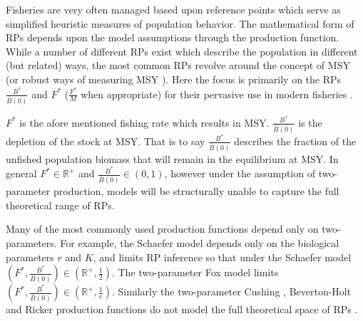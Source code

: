 \documentclass[11pt]{ucscthesis}
\begin{document}
{%
Fisheries are very often managed based upon reference points %
which serve as simplified heuristic measures of population behavior. The
mathematical form of RPs depends upon the model assumptions through the
production function. %
While a number of different RPs exist which describe the population in different
(but related) ways, the most common RPs revolve around the concept of MSY (or robust
ways of measuring MSY \cite{hilborn_pretty_2010,punt_management_2016}).
Here the focus is primarily on the RPs $\frac{B^*}{\bar B(0)}$ and $F^*$ ($\frac{F^*}{M}$ when appropriate)
for their pervasive use in modern fisheries \cite{punt_extending_2019}. %

%
$F^*$ is the afore mentioned fishing rate which results in MSY. $\frac{B^*}{\bar B(0)}$
is the depletion of the stock at MSY. That is to say $\frac{B^*}{\bar B(0)}$ describes
the fraction of the unfished population biomass that will remain in the equilibrium
at MSY. In general $F^*\in\mathbb{R}^+$ and \mbox{$\frac{B^*}{\bar B(0)}\in\left(0, 1\right)$,}
however under the assumption of two-parameter production, %
models will be structurally unable to capture the full theoretical range of RPs.

%
Many of the most commonly used production functions depend only
on two-parameters. For example, the Schaefer model %
depends only on the biological parameters $r$ and $K$, and limits RP inference
so that under the Schaefer model $\left(F^*, \frac{B^*}{\bar B(0)}\right)\in \left(\mathbb{R}^+, \frac{1}{2}\right)$.
The two-parameter Fox model \cite{fox_jr_exponential_1970} limits $\left(F^*, \frac{B^*}{\bar B(0)}\right)\in \left(\mathbb{R}^+, \frac{1}{e}\right)$.
Similarly the two-parameter Cushing \cite{cushing_dependence_1971}, Beverton-Holt \cite[BH]{beverton_dynamics_1957}
and Ricker \cite{ricker_stock_1954} production functions do not model the full theoretical space of
RPs \cite{mangel_perspective_2013, yeakel_generalized_2015}.

}
\end{document}
